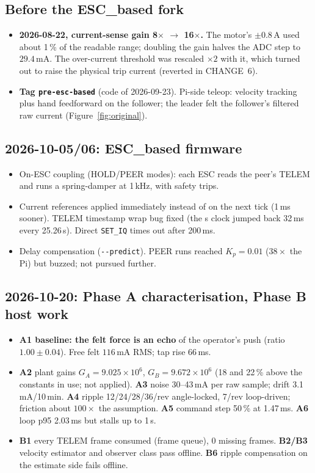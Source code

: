 \documentclass[11pt,a4paper]{article}
\newcommand{\mA}{\,\mathrm{mA}}
\newcommand{\A}{\,\mathrm{A}}
\begin{document}
\subsection*{Before the ESC\_based fork}
\begin{itemize}
  \item \textbf{2026-08-22, current-sense gain 8$\times$ $\to$ 16$\times$.}
        The motor's $\pm0.8\A$ used about 1\,\% of the readable range;
        doubling the gain halves the ADC step to $29.4\mA$. The
        over-current threshold was rescaled $\times2$ with it, which turned
        out to raise the physical trip current (reverted in CHANGE~6).
  \item \textbf{Tag \texttt{pre-esc-based}} (code of 2026-09-23). Pi-side teleop:
        velocity tracking plus hand feedforward on the follower; the leader
        felt the follower's filtered raw current (Figure~\ref{fig:original}).
\end{itemize}

\subsection*{2026-10-05/06: ESC\_based firmware}
\begin{itemize}
  \item On-ESC coupling (HOLD/PEER modes): each ESC reads the peer's TELEM
        and runs a spring-damper at 1\,kHz, with safety trips.
  \item Current references applied immediately instead of on the next
        tick (1\,ms sooner). TELEM timestamp wrap bug fixed (the \textmu s
        clock jumped back 32\,ms every 25.26\,s). Direct \texttt{SET\_IQ}
        times out after 200\,ms.
  \item Delay compensation (\texttt{-{}-predict}). PEER runs reached
        $K_p = 0.01$ ($38\times$ the Pi) but buzzed; not pursued further.
\end{itemize}

\subsection*{2026-10-20: Phase A characterisation, Phase B host work}
\begin{itemize}
  \item \textbf{A1 baseline: the felt force is an echo} of the operator's
        push (ratio $1.00\pm0.04$). Free felt $116\mA$ RMS; tap rise 66\,ms.
  \item \textbf{A2} plant gains $G_A = 9.025\times10^6$, $G_B = 9.672\times10^6$
        (18 and 22\,\% above the constants in use; not applied).
        \textbf{A3} noise 30--43\,mA per raw sample; drift 3.1\,mA/10\,min.
        \textbf{A4} ripple 12/24/28/36/rev angle-locked, 7/rev loop-driven;
        friction about $100\times$ the assumption. \textbf{A5} command step
        50\,\% at 1.47\,ms. \textbf{A6} loop p95 2.03\,ms but stalls up to 1\,s.
  \item \textbf{B1} every TELEM frame consumed (frame queue), 0 missing
        frames. \textbf{B2/B3} velocity estimator and observer class pass
        offline. \textbf{B6} ripple compensation on the estimate side fails
        offline.
\end{itemize}
\end{document}

